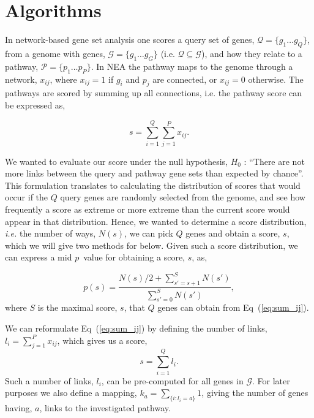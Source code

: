 \documentclass[10pt,letterpaper]{article}
\begin{document}
\section*{Algorithms}

In network-based gene set analysis one scores a query set of genes, $ \mathcal{Q}=\{g_1 \ldots g_Q\}$, from a genome with genes, $\mathcal{G}=\{g_1 \ldots g_G\}$ (i.e. $\mathcal{Q} \subseteq \mathcal{G}$), and how they relate to a pathway, $\mathcal{P}=\{p_1 \ldots p_P\}$. In NEA the pathway maps to the genome through a network, ${x_{ij}}$, where $x_{ij}=1$ if $g_i$ and $p_j$ are connected, or $x_{ij}=0$ otherwise. The pathways are scored by summing up all connections, i.e. the pathway score can be expressed as,

\begin{equation}
s=\sum_{i=1}^Q\sum_{j=1}^P x_{ij}.
\label{eq:sum_ij}
\end{equation}

We wanted to evaluate our score under the null hypothesis, $H_0$ : ``There are not more links between the query and pathway gene sets than expected by chance''. This formulation translates to calculating the distribution of scores that would occur if the $Q$ query genes are randomly selected from the genome, and see how frequently a score as extreme or more extreme than the current score would appear in that distribution. Hence, we wanted to determine a score distribution, {\em i.e.} the number of ways, $N(s)$, we can pick $Q$ genes and obtain a score, $s$, which we will give two methods for below. Given such a score distribution, we can express a mid $p$~value\cite{lancaster1961significance,hwang2001optimality} for obtaining a score, $s$, as,

\begin{equation}
p(s)=\frac{N(s)/2 +\sum_{s'=s+1}^{S} N(s')}{\sum_{s'=0}^{S} N(s')},
\label{eq:pval}
\end{equation}
where $S$ is the maximal score, $s$, that $Q$ genes can obtain from Eq~(\ref{eq:sum_ij}).

We can reformulate Eq~(\ref{eq:sum_ij}) by defining the number of links, $l_i=\sum_{j=1}^P x_{ij}$, which gives us a score,
\begin{equation}
s=\sum_{i=1}^Q l_i.
\label{eq:sum_i}
\end{equation}
Such a number of links, $l_i$, can be pre-computed for all genes in $\mathcal{G}$. For later purposes we also define a mapping, $k_a=\sum_{\{i:l_i=a\}}1$, giving the number of genes having, $a$, links to the investigated pathway.
\end{document}
